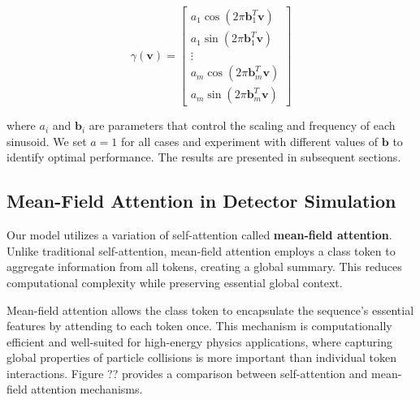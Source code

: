 \begin{equation}
\gamma(\mathbf{v}) = 
\begin{bmatrix}
a_1 \cos(2 \pi \mathbf{b}_1^T \mathbf{v}) \\ 
a_1 \sin(2 \pi \mathbf{b}_1^T \mathbf{v}) \\ 
\vdots \\ 
a_m \cos(2 \pi \mathbf{b}_m^T \mathbf{v}) \\ 
a_m \sin(2 \pi \mathbf{b}_m^T \mathbf{v})
\end{bmatrix}
\end{equation}

where \( a_i \) and \( \mathbf{b}_i \) are parameters that control the scaling and frequency of each sinusoid. We set \( a = 1 \) for all cases and experiment with different values of \( \mathbf{b} \) to identify optimal performance. The results are presented in subsequent sections.

\subsection{Mean-Field Attention in Detector Simulation}
Our model utilizes a variation of self-attention called \textbf{mean-field attention}. Unlike traditional self-attention, mean-field attention employs a class token to aggregate information from all tokens, creating a global summary. This reduces computational complexity while preserving essential global context.

Mean-field attention allows the class token to encapsulate the sequence's essential features by attending to each token once. This mechanism is computationally efficient and well-suited for high-energy physics applications, where capturing global properties of particle collisions is more important than individual token interactions. Figure ?? provides a comparison between self-attention and mean-field attention mechanisms.

